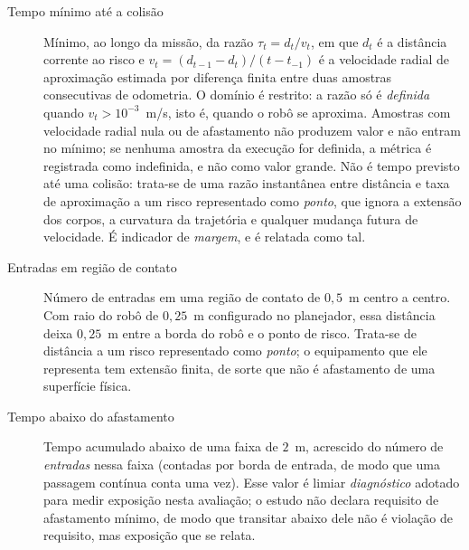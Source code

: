 \begin{description}
    \item[Tempo mínimo até a colisão] Mínimo, ao longo da missão, da razão
    $\tau_t = d_t / v_t$, em que $d_t$ é a distância corrente ao risco e
    $v_t = (d_{t-1}-d_t)/(t-t_{-1})$ é a velocidade radial de aproximação estimada por
    diferença finita entre duas amostras consecutivas de odometria. O domínio é
    restrito: a razão só é \emph{definida} quando $v_t > 10^{-3}$~m/s, isto é,
    quando o robô se aproxima. Amostras com velocidade radial nula ou de afastamento
    não produzem valor e não entram no mínimo; se nenhuma amostra da execução for
    definida, a métrica é registrada como indefinida, e não como valor grande. Não é
    tempo previsto até uma colisão: trata-se de uma razão instantânea entre distância e
    taxa de aproximação a um risco representado como \emph{ponto}, que ignora a
    extensão dos corpos, a curvatura da trajetória e qualquer mudança futura de
    velocidade. É indicador de \emph{margem}, e é relatada como tal.

    \item[Entradas em região de contato] Número de entradas em uma região de contato de $0{,}5$~m
    centro a centro. Com raio do robô de $0{,}25$~m configurado no planejador, essa
    distância deixa $0{,}25$~m entre a borda do robô e o ponto de risco. Trata-se de
    distância a um risco representado como \emph{ponto}; o equipamento que ele
    representa tem extensão finita, de sorte que não é afastamento de uma superfície
    física.

    \item[Tempo abaixo do afastamento] Tempo acumulado abaixo de uma faixa de $2$~m,
    acrescido do número de \emph{entradas} nessa faixa (contadas por borda de entrada,
    de modo que uma passagem contínua conta uma vez). Esse valor é limiar
    \emph{diagnóstico} adotado para medir exposição nesta avaliação; o estudo não
    declara requisito de afastamento mínimo, de modo que transitar abaixo dele não é
    violação de requisito, mas exposição que se relata.


\end{description}
